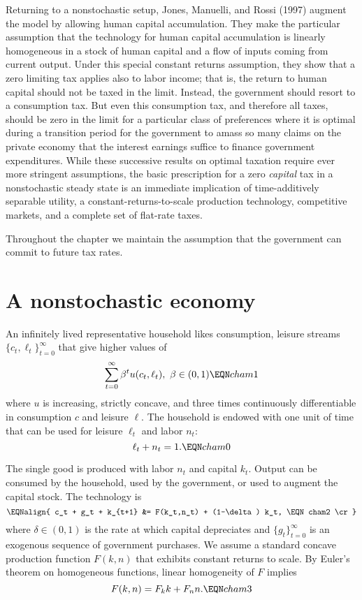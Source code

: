   
Returning to a nonstochastic setup, Jones, Manuelli, and Rossi
(1997)
augment the model by allowing human capital accumulation. They
make the  particular assumption that the technology for human
capital accumulation is linearly homogeneous in a stock of human
capital and a flow of  inputs coming from current output. Under
this special constant returns assumption, they show that a zero
limiting tax applies also to labor income; that is, the return to
human capital should not be taxed in the limit. Instead, the
government should resort to a consumption tax. But even this
consumption tax, and therefore all taxes, should be zero in the
limit for a particular class of preferences where it is optimal
during a transition period
for the government to amass so many
claims on the private economy that the interest earnings suffice
to finance government expenditures.
While these successive results on optimal taxation
require ever more stringent assumptions, the
basic prescription for a zero {\it capital\/} tax in a
nonstochastic steady state is an immediate implication of
time-additively separable utility, a
constant-returns-to-scale production technology,
competitive markets, and a complete set of flat-rate taxes.

Throughout the chapter we maintain the assumption that the
government can commit to future tax rates.

\section{A nonstochastic economy}

An infinitely lived  representative household
 likes consumption, leisure streams $\{c_t, \ell_t\}_{t=0}^\infty$
that give higher values of
$$ \sum_{t=0}^\infty \beta^t u(c_t, \ell_t), \ \beta \in (0,1) \EQN cham1 $$
where $u$ is  increasing, strictly concave, and
three times  continuously differentiable in consumption  $c$ and leisure $\ell$.
The household is endowed with one unit of time that can be used for leisure
$\ell_t$ and labor $n_t$:
$$
\ell_t+n_t=1.                                                  \EQN cham0
$$

The single good is produced with labor $n_t$ and capital $k_t$.
Output can be consumed by the household, used by the government, or used
to augment the capital stock. The technology is
$$\EQNalign{ c_t + g_t + k_{t+1} &= F(k_t,n_t) + (1-\delta) k_t, \EQN cham2
                                                                        \cr}$$
where $\delta \in (0,1)$ is the rate at which capital depreciates and
$\{g_t\}_{t=0}^\infty$ is an exogenous sequence of government
purchases.
We assume a standard concave production function
$F(k,n)$ that exhibits constant returns to scale. By
Euler's theorem on homogeneous functions,  linear homogeneity of $F$   implies
$$ F(k,n) = F_k k + F_n n. \EQN cham3 $$

